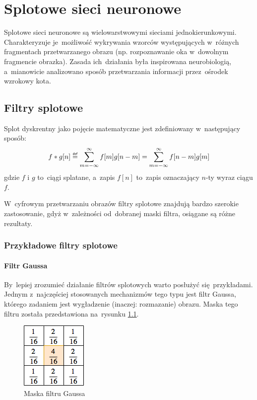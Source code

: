 \chapter{Splotowe sieci neuronowe}
Splotowe sieci neuronowe są wielowarstwowymi sieciami jednokierunkowymi. Charakteryzuje je~możliwość
wykrywania wzorców występujących w~różnych fragmentach przetwarzanego obrazu (np. rozpoznawanie oka
w~dowolnym fragmencie obrazka). Zasada ich~działania była inspirowana neurobiologią, a~mianowicie analizowano
sposób przetwarzania informacji przez~ośrodek wzrokowy kota.

\section{Filtry splotowe}
Splot dyskrentny jako pojęcie matematyczne jest zdefiniowany w~następujący sposób:
$$ f\ast g[n]\defeq \sum\limits_{m=-\infty}^{\infty}f[m]g[n-m] = \sum\limits_{m=-\infty}^{\infty}f[n-m]g[m]$$
gdzie $f$ i $g$ to~ciągi splatane, a~zapis $f[n]$ to~zapis oznaczający $n$-ty wyraz ciągu $f$.

W~cyfrowym przetwarzaniu obrazów filtry splotowe znajdują bardzo szerokie zastosowanie, gdyż w~zależności
od~dobranej maski filtra, osiągane są różne rezultaty.

\subsection{Przykładowe filtry splotowe}
\subsubsection{Filtr Gaussa}
By~lepiej zrozumieć działanie filtrów splotowych warto posłużyć się~przykładami. Jednym z~najczęściej stosowanych
mechanizmów tego typu jest filtr Gaussa, którego zadaniem jest wygładzenie (inaczej: rozmazanie) obrazu.
Maska tego filtru została przedstawiona na~rysunku \ref{rys:maska-gauss}.
\begin{figure}[H]
	\centering
	\includegraphics[width=0.25\linewidth]{img/gauss-conv-kernel.png}
	\caption{Maska filtru Gaussa}
	\label{rys:maska-gauss}
\end{figure}

